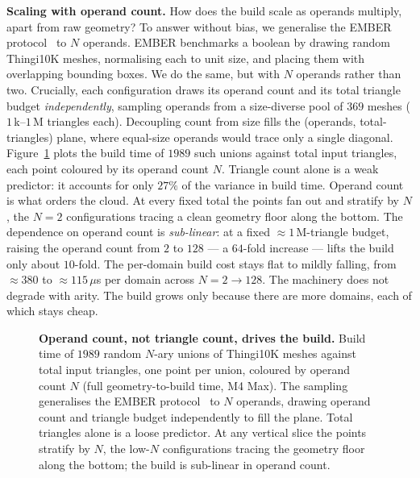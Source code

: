 \documentclass{egpubl}
\begin{document}
\textbf{Scaling with operand count.} How does the build scale as operands multiply, apart from raw geometry? To answer without bias, we generalise the EMBER protocol~\cite{Trettner2022} to $N$ operands. EMBER benchmarks a boolean by drawing random Thingi10K meshes, normalising each to unit size, and placing them with overlapping bounding boxes. We do the same, but with $N$ operands rather than two. Crucially, each configuration draws its operand count and its total triangle budget \emph{independently}, sampling operands from a size-diverse pool of $369$ meshes ($1$\,k--$1$\,M triangles each). Decoupling count from size fills the (operands, total-triangles) plane, where equal-size operands would trace only a single diagonal. Figure~\ref{fig:nary-scaling} plots the build time of $1989$ such unions against total input triangles, each point coloured by its operand count $N$. Triangle count alone is a weak predictor: it accounts for only $27\%$ of the variance in build time. Operand count is what orders the cloud. At every fixed total the points fan out and stratify by $N$, the $N{=}2$ configurations tracing a clean geometry floor along the bottom. The dependence on operand count is \emph{sub-linear}: at a fixed $\approx\!1$\,M-triangle budget, raising the operand count from $2$ to $128$ --- a $64$-fold increase --- lifts the build only about $10$-fold. The per-domain build cost stays flat to mildly falling, from $\approx\!380$ to $\approx\!115$\,$\mu$s per domain across $N{=}2\to128$. The machinery does not degrade with arity. The build grows only because there are more domains, each of which stays cheap.

\begin{figure}[t]
  \centering
  
  \caption{\textbf{Operand count, not triangle count, drives the build.} Build time of $1989$ random $N$-ary unions of Thingi10K meshes against total input triangles, one point per union, coloured by operand count $N$ (full geometry-to-build time, M4 Max). The sampling generalises the EMBER protocol~\cite{Trettner2022} to $N$ operands, drawing operand count and triangle budget independently to fill the plane. Total triangles alone is a loose predictor. At any vertical slice the points stratify by $N$, the low-$N$ configurations tracing the geometry floor along the bottom; the build is sub-linear in operand count.}
  \label{fig:nary-scaling}
\end{figure}
\end{document}
